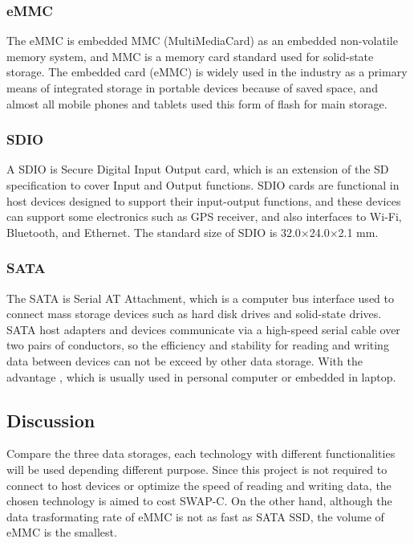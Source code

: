 \documentclass[letterpaper,10pt,serif,draftclsnofoot,onecolumn,compsoc,titlepage]{IEEEtran}
\begin{document}
\subsubsection{eMMC}
The eMMC is embedded MMC (MultiMediaCard) as an embedded non-volatile memory system, and MMC is a 
memory card standard used for solid-state storage. The embedded card (eMMC) is widely used in the 
industry as a primary means of integrated storage in portable devices because of saved space, and 
almost all mobile phones and tablets used this form of flash for main storage. \\

\subsubsection{SDIO}
A SDIO is Secure Digital Input Output card, which is an extension of the SD specification to cover 
Input and Output functions. SDIO cards are functional in host devices designed to support their 
input-output functions, and these devices can support some electronics such as GPS receiver, and 
also interfaces to Wi-Fi, Bluetooth, and Ethernet. The standard size of SDIO is 32.0×24.0×2.1 mm. \\

\subsubsection{SATA}
The SATA is Serial AT Attachment, which is a computer bus interface used to connect mass storage 
devices such as hard disk drives and solid-state drives. SATA host adapters and devices communicate 
via a high-speed serial cable over two pairs of conductors, so the efficiency and stability for 
reading and writing data between devices can not be exceed by other data storage. With the advantage
, which is usually used in personal computer or embedded in laptop. \\

\subsection{Discussion}
Compare the three data storages, each technology with different functionalities will be used depending
 different purpose. Since this project is not required to connect to host devices or optimize the 
 speed of reading and writing data, the chosen technology is aimed to cost SWAP-C. On the other hand, 
 although the data trasformating rate of eMMC is not as fast as SATA SSD, the volume of eMMC is the 
 smallest. \\
\end{document}
